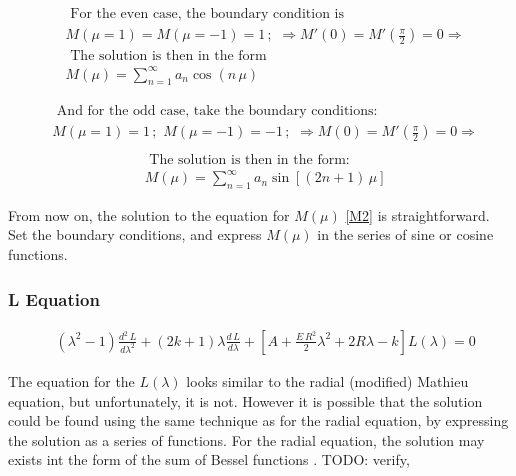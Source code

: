 \begin{equation}\label{Meven}
\begin{split}
& \text{ For the even case, the boundary condition is } \\[.8em]
& M(\mu = 1) = M(\mu = -1) = 1\,;\,\,\Rightarrow  M'(0) = M'\left(\frac{\pi}{2}\right) = 0 \Rightarrow \\[.8em] 
& \text{ The solution is then in the form } \\[.8em]
& M(\mu) = \sum_{n=1}^{\infty}{a_n \cos\left(n\,\mu\right)}
\end{split}
\end{equation}

\begin{equation}\label{Modd1}
\begin{split}
& \text{ And for the odd case, take the boundary conditions: } \\[.8em]
& M(\mu = 1) = 1\,;\,\,M(\mu = -1) = -1\,;\,\,\Rightarrow  M(0) = M'\left(\frac{\pi}{2}\right) = 0 \Rightarrow \\[.8em] 
\end{split}
\end{equation}
\begin{equation}\label{Modd2}
\begin{split}
& \text{ The solution is then in the form: } \\[.8em]
& M(\mu) = \sum_{n=1}^{\infty}{a_n \sin\left[\left(2n+1\right)\,\mu\right]} 
\end{split}
\end{equation}

From now on, the solution to the equation for $ M(\mu) $ \eqref{M2} is straightforward. Set the boundary conditions, and express  $ M(\mu) $ in the series of sine or cosine functions.

\subsubsection{ L Equation }

\begin{equation}\label{L2-2}
\begin{split}
& (\lambda^2-1)\frac{d^2\,L}{d\lambda^2} + (2k+1)\lambda \frac{d\,L}{d\lambda} +  \left[A + \frac{E\,R^2}{2}\lambda^2 + 2R\lambda  -k \right]L(\lambda) = 0
\end{split}
\end{equation}

The equation for the $ L(\lambda) $ looks similar to the radial (modified) Mathieu equation, but unfortunately, it is not. However it is possible that the solution could be found using the same technique as for the radial equation, by expressing the solution as a series of functions. For the radial equation, the solution may exists int the form of the sum of Bessel functions \cite{Mathieu4}.  TODO: verify,

